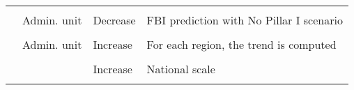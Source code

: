 \documentclass[
  12pt,
  oneside]{report}
\begin{document}
\begin{landscape}
\begin{longtable}[t]{>{\raggedright\arraybackslash}p{6.5em}>{\raggedright\arraybackslash}p{6.5em}>{\raggedright\arraybackslash}p{6.5em}>{\raggedright\arraybackslash}p{40em}}
\cellcolor{gray!6}{} & \cellcolor{gray!6}{Admin. unit} & \cellcolor{gray!6}{Decrease} & \cellcolor{gray!6}{FBI prediction with CAP greening cenario}\\
 & Admin. unit & Decrease & FBI prediction with No Pillar I scenario\\
\cellcolor{gray!6}{} & \cellcolor{gray!6}{Admin. unit} & \cellcolor{gray!6}{Decrease} & \cellcolor{gray!6}{FBI prediction with biofuel scenario}\\
\addlinespace
\cite{van_turnhout_scale-dependent_2007} & Admin. unit & Increase & For each region, the trend is computed\\
\cellcolor{gray!6}{} & \cellcolor{gray!6}{25} & \cellcolor{gray!6}{Increase} & \cellcolor{gray!6}{Mainly increase of SR but the proportion of negative trend were higher than for the regional scale}\\
 & 41543 & Increase & National scale\\*
\end{longtable}
\endgroup{}
\end{landscape}

\singlespacing


\renewcommand\bibname{References}
  
\end{document}

